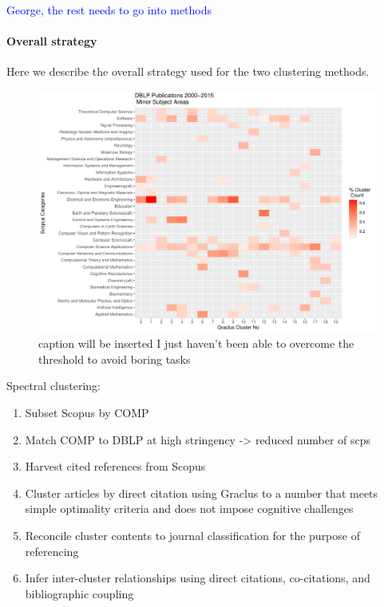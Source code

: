 \textcolor{blue}{George, the rest needs to go into methods}


\paragraph{Overall strategy}

Here we describe the overall strategy used for the two clustering methods.\\
\begin{figure}[ht]
  \includegraphics[scale=0.5]{scopus_dblp_graclus2.pdf}
\caption{caption will be inserted I just haven't been able to overcome the threshold to avoid boring tasks}
\label{heatmap}       %
\end{figure}

\noindent
 Spectral clustering:
\begin{enumerate}
\item Subset Scopus by COMP
\item Match COMP to DBLP at high stringency -> reduced number of scps
 \item Harvest cited references  from Scopus
 \item Cluster articles by direct citation using Graclus to a number that meets simple optimality criteria and does not impose cognitive challenges
 \item Reconcile cluster contents to journal classification for the purpose of referencing
 \item Infer inter-cluster relationships using direct citations, co-citations, and bibliographic coupling
\end{enumerate}


